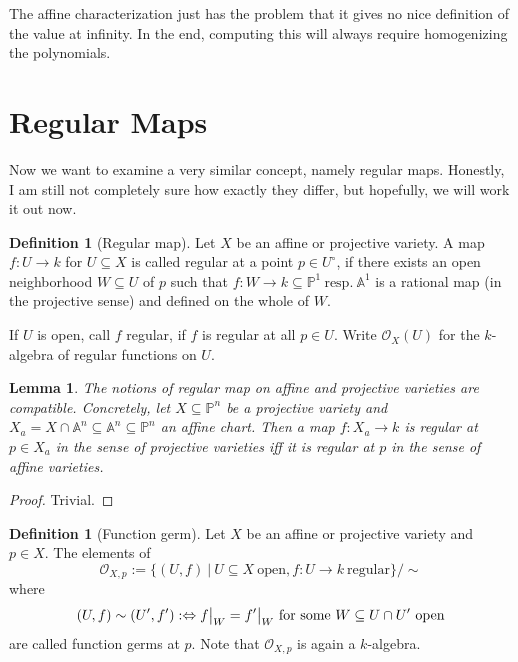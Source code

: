 \documentclass{scrartcl}
\newcommand\restr[2]{{
    \left.\kern-\nulldelimiterspace
    #1
    \vphantom{\big|}
    \right|_{#2}
}}
\newtheorem{lemma}[prop]{Lemma}
\theoremstyle{definition}
\newtheorem{definition}[prop]{Definition}
\begin{document}
The affine characterization just has the problem that it gives no nice definition of the value at infinity.
In the end, computing this will always require homogenizing the polynomials.

\section{Regular Maps}
Now we want to examine a very similar concept, namely regular maps.
Honestly, I am still not completely sure how exactly they differ, but hopefully, we will work it out now. 

\begin{definition}[Regular map]
    Let $X$ be an affine or projective variety. A map $f: U \to k$ for $U \subseteq X$ is called regular at a point $p \in U^\circ$, if there exists an open neighborhood $W \subseteq U$ of $p$ such that $f: W \to k \subseteq \mathbb{P}^1 \ \text{resp.} \ \mathbb{A}^1$ is a rational map (in the projective sense) and defined on the whole of $W$.
    
    If $U$ is open, call $f$ regular, if $f$ is regular at all $p \in U$. Write $\mathcal{O}_X(U)$ for the $k$-algebra of regular functions on $U$.
\end{definition}
\begin{lemma}
    The notions of regular map on affine and projective varieties are compatible.
    Concretely, let $X \subseteq \mathbb{P}^n$ be a projective variety and $X_a = X \cap \mathbb{A}^n \subseteq \mathbb{A}^n \subseteq \mathbb{P}^n$ an affine chart.
    Then a map $f: X_a \to k$ is regular at $p \in X_a$ in the sense of projective varieties iff it is regular at $p$ in the sense of affine varieties.
\end{lemma}
\begin{proof}
Trivial.
\end{proof}
\begin{definition}[Function germ]
    Let $X$ be an affine or projective variety and $p \in X$.
    The elements of
    \begin{equation*}
        \mathcal{O}_{X, p} := \{ (U, f) \ | \ U \subseteq X \ \text{open}, f: U \to k \ \text{regular} \} / \sim
    \end{equation*}
    where
    \begin{equation*}
        (U, f) \sim (U', f') :\Leftrightarrow \restr{f}{W} = \restr{f'}{W} \ \text{for some $W \subseteq U \cap U'$ open}
    \end{equation*}
    are called function germs at $p$.
    Note that $\mathcal{O}_{X, p}$ is again a $k$-algebra.
\end{definition}
\end{document}
